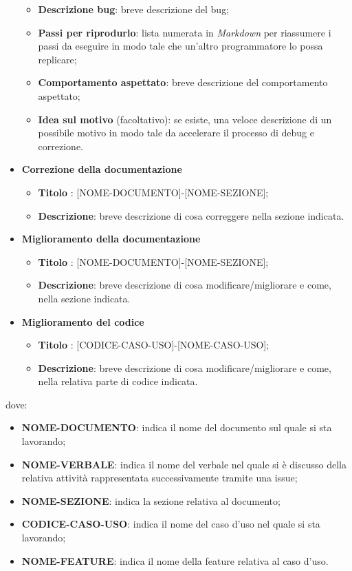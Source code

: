 \begin{itemize}
\begin{itemize}
                \item \textbf{Descrizione bug}: breve descrizione del bug;
                \item \textbf{Passi per riprodurlo}: lista numerata in \textit{Markdown} per riassumere i passi da eseguire in modo tale che un'altro programmatore lo possa replicare;
                \item \textbf{Comportamento aspettato}: breve descrizione del comportamento aspettato;
                \item \textbf{Idea sul motivo} (facoltativo): se esiste, una veloce descrizione di un possibile motivo in modo tale da accelerare il processo di debug e correzione.
            \end{itemize}
            \item  \textbf{Correzione della documentazione}
            \begin{itemize}
                \item \textbf{Titolo} : [NOME-DOCUMENTO]-[NOME-SEZIONE];
                \item \textbf{Descrizione}: breve descrizione di cosa correggere nella sezione indicata.
            \end{itemize}
            \item  \textbf{Miglioramento della documentazione}
            \begin{itemize}
                \item \textbf{Titolo} : [NOME-DOCUMENTO]-[NOME-SEZIONE];
                \item \textbf{Descrizione}: breve descrizione di cosa modificare/migliorare e come, nella sezione indicata.
            \end{itemize}
            \item  \textbf{Miglioramento del codice}
            \begin{itemize}
                 \item \textbf{Titolo} : [CODICE-CASO-USO]-[NOME-CASO-USO];
                 \item \textbf{Descrizione}: breve descrizione di cosa modificare/migliorare e come, nella relativa parte di codice indicata.
            \end{itemize}
        \end{itemize}
        dove:

        \begin{itemize}
            \item \textbf{NOME-DOCUMENTO}: indica il nome del documento sul quale si sta lavorando;
            \item \textbf{NOME-VERBALE}: indica il nome del verbale nel quale si è discusso della relativa attività rappresentata successivamente tramite una issue;
            \item \textbf{NOME-SEZIONE}: indica la sezione relativa al documento;
            \item \textbf{CODICE-CASO-USO}: indica il nome del caso d'uso nel quale si sta lavorando;
            \item \textbf{NOME-FEATURE}: indica il nome della feature relativa al caso d'uso.
        \end{itemize}


